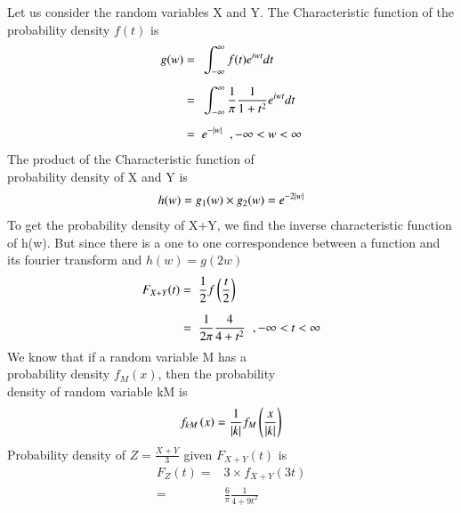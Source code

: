 Let us consider the random variables X and Y.
    The Characteristic function of the probability density $f(t)$ is
    \begin{align}
        g(w) =\hspace{0.2cm} & \int_{-\infty}^{\infty}  f(t) {e}^{iwt} dt                                         \\[0.2cm]
        =\hspace{0.2cm}      & \int_{-\infty}^{\infty}  \displaystyle\frac{1}{\pi} \frac{1}{1+{t}^2} {e}^{iwt} dt \\[0.2cm]
        =\hspace{0.2cm}      & e^{-\left\vert w\right\vert}\hspace{0.2cm}, -\infty<w<\infty
    \end{align}
    The product of the Characteristic function of \\probability density of X and Y is
    \begin{align}
        h(w) = g_1(w) \times g_2(w) = {e}^{-2\left\vert w\right\vert}
    \end{align}
    To get the probability density of X+Y, we find the inverse characteristic function of h(w). But since there is a one to one correspondence between a function and its fourier transform and
$h(w) = g(2w)$
    \begin{align}
        F_{X+Y}(t) =\hspace{0.2cm} & \frac{1}{2}f\left(\frac{t}{2}\right)                                        \\[0.2cm]
        =\hspace{0.2cm}            & \frac{1}{2\pi} \frac{4}{4+{t}^2} \hspace{0.2cm},-\infty<t<\infty
    \end{align}
    We know that if a random variable M has a\\probability density $f_M(x)$, then the probability \\density of random variable kM is
    \begin{align}
        f_{kM}\left(x\right) = \frac{1}{\left\vert k\right\vert} f_M\left(\frac{x}{\left\vert k\right\vert}\right)
    \end{align}
    Probability density of $Z = \displaystyle\frac{X+Y}{3}$ given $F_{X+Y}(t)$ is
\begin{align}
    F_{Z}(t) = & 3\times \displaystyle f_{X+Y}(3t) \\
    =          & \frac{6}{\pi} \frac{1}{4+9{t}^2}
\end{align}
